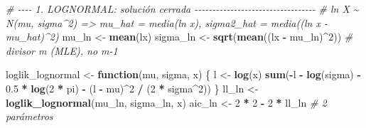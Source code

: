 \documentclass[
  spanish,
]{article}
\newenvironment{Shaded}{\begin{snugshade}}{\end{snugshade}}
\newcommand{\CommentTok}[1]{\textcolor[rgb]{0.56,0.35,0.01}{\textit{#1}}}
\newcommand{\ControlFlowTok}[1]{\textcolor[rgb]{0.13,0.29,0.53}{\textbf{#1}}}
\newcommand{\DecValTok}[1]{\textcolor[rgb]{0.00,0.00,0.81}{#1}}
\newcommand{\FloatTok}[1]{\textcolor[rgb]{0.00,0.00,0.81}{#1}}
\newcommand{\FunctionTok}[1]{\textcolor[rgb]{0.13,0.29,0.53}{\textbf{#1}}}
\newcommand{\NormalTok}[1]{#1}
\newcommand{\OtherTok}[1]{\textcolor[rgb]{0.56,0.35,0.01}{#1}}
\newcommand{\SpecialCharTok}[1]{\textcolor[rgb]{0.81,0.36,0.00}{\textbf{#1}}}
\begin{document}
\begin{Shaded}
\begin{Highlighting}[]
\CommentTok{\# {-}{-}{-}{-} 1. LOGNORMAL: solución cerrada {-}{-}{-}{-}{-}{-}{-}{-}{-}{-}{-}{-}{-}{-}{-}{-}{-}{-}{-}{-}{-}{-}{-}{-}{-}{-}{-}{-}{-}{-}{-}{-}{-}{-}}
\CommentTok{\# ln X \textasciitilde{} N(mu, sigma\^{}2)  =\textgreater{}  mu\_hat = media(ln x),  sigma2\_hat = media((ln x {-} mu\_hat)\^{}2)}
\NormalTok{mu\_ln    }\OtherTok{\textless{}{-}} \FunctionTok{mean}\NormalTok{(lx)}
\NormalTok{sigma\_ln }\OtherTok{\textless{}{-}} \FunctionTok{sqrt}\NormalTok{(}\FunctionTok{mean}\NormalTok{((lx }\SpecialCharTok{{-}}\NormalTok{ mu\_ln)}\SpecialCharTok{\^{}}\DecValTok{2}\NormalTok{))        }\CommentTok{\# divisor m (MLE), no m{-}1}

\NormalTok{loglik\_lognormal }\OtherTok{\textless{}{-}} \ControlFlowTok{function}\NormalTok{(mu, sigma, x) \{}
\NormalTok{  l }\OtherTok{\textless{}{-}} \FunctionTok{log}\NormalTok{(x)}
  \FunctionTok{sum}\NormalTok{(}\SpecialCharTok{{-}}\NormalTok{l }\SpecialCharTok{{-}} \FunctionTok{log}\NormalTok{(sigma) }\SpecialCharTok{{-}} \FloatTok{0.5} \SpecialCharTok{*} \FunctionTok{log}\NormalTok{(}\DecValTok{2} \SpecialCharTok{*}\NormalTok{ pi) }\SpecialCharTok{{-}}\NormalTok{ (l }\SpecialCharTok{{-}}\NormalTok{ mu)}\SpecialCharTok{\^{}}\DecValTok{2} \SpecialCharTok{/}\NormalTok{ (}\DecValTok{2} \SpecialCharTok{*}\NormalTok{ sigma}\SpecialCharTok{\^{}}\DecValTok{2}\NormalTok{))}
\NormalTok{\}}
\NormalTok{ll\_ln  }\OtherTok{\textless{}{-}} \FunctionTok{loglik\_lognormal}\NormalTok{(mu\_ln, sigma\_ln, x)}
\NormalTok{aic\_ln }\OtherTok{\textless{}{-}} \DecValTok{2} \SpecialCharTok{*} \DecValTok{2} \SpecialCharTok{{-}} \DecValTok{2} \SpecialCharTok{*}\NormalTok{ ll\_ln                    }\CommentTok{\# 2 parámetros}


\end{Highlighting}
\end{Shaded}
\end{document}
